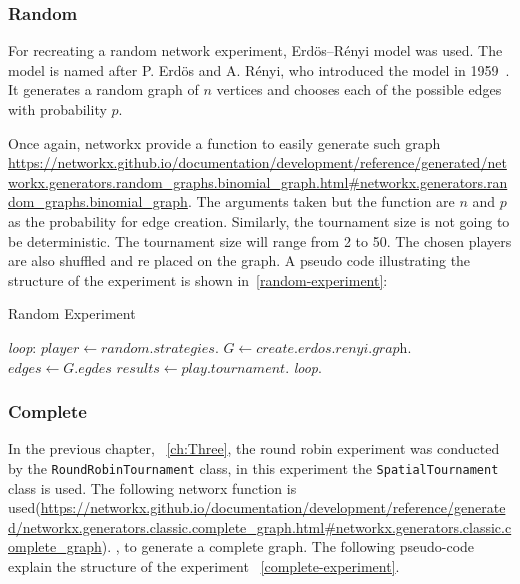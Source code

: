 \subsubsection{Random}

For recreating a random network experiment, Erd\"{o}s–R\'{e}nyi model was used.
The model is named after P. Erd\"{o}s and A. R\'{e}nyi, who introduced
the model in 1959~\cite{Erdos1959}. It generates a random graph of \(n\)
vertices and chooses each of the possible edges with probability \(p\).

Once again, networkx provide a function to easily generate such graph
\url{https://networkx.github.io/documentation/development/reference/generated/networkx.generators.random_graphs.binomial_graph.html#networkx.generators.random_graphs.binomial_graph}.
The arguments taken but the function are \(n\)  and \(p\) as the probability for
edge creation. Similarly, the tournament size is not going to be deterministic.
The tournament size will range from 2 to 50. The chosen players are also shuffled
and re placed on the graph. A pseudo code illustrating the structure of the
experiment is shown in~\ref{random-experiment}:

\begin{algorithm}
	\caption{Random Experiment}\label{random-experiment}
	\begin{algorithmic}
		\BState \emph{loop}:
		\State $player \gets \textit{random.strategies}$.
		\State $G \gets \textit{create.erdos.renyi.graph}$.
		\State $edges \gets \textit{G.egdes}$
		\State $results \gets \textit{play.tournament}$.
		\emph{loop}.
		\EndFor
		\EndFor
		\EndFor
		\EndProcedure
	\end{algorithmic}
\end{algorithm}

\subsubsection{Complete}

In the previous chapter, ~\ref{ch:Three}, the round robin experiment was
conducted by the \texttt{RoundRobinTournament} class, in this experiment the
\texttt{SpatialTournament} class is used.
The following networx function is used(\url{https://networkx.github.io/documentation/development/reference/generated/networkx.generators.classic.complete_graph.html#networkx.generators.classic.complete_graph}).
, to generate a complete graph. The following pseudo-code explain the structure
of the experiment ~\ref{complete-experiment}.

